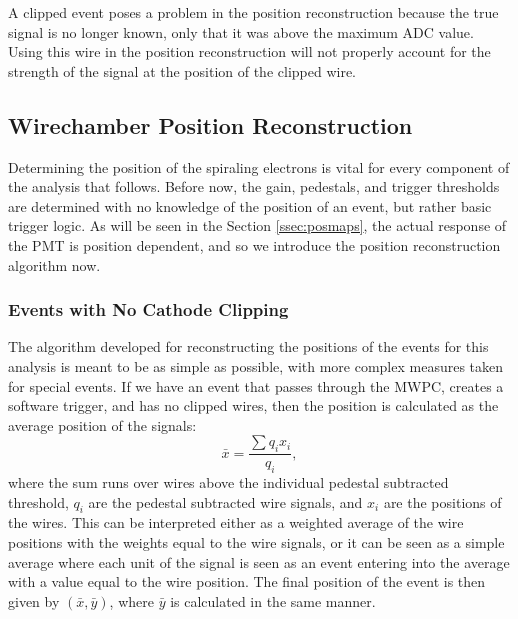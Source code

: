 A clipped event poses a problem in the position reconstruction because the true signal
is no longer known, only that it was above the maximum ADC value. Using this wire in
the position reconstruction will not properly account for the strength of the
signal at the position of the clipped wire.

\subsection{Wirechamber Position Reconstruction}

Determining the position of the spiraling electrons is vital for every component of the analysis
that follows. Before now, the gain, pedestals, and trigger thresholds are determined with no
knowledge of the position of an event, but rather basic trigger logic. As will be seen in
the Section \ref{ssec:posmaps}, the actual response of the PMT is position dependent, and so we introduce the
position reconstruction algorithm now.

\subsubsection{Events with No Cathode Clipping}

The algorithm developed for reconstructing the positions of the events for this analysis
is meant to be as simple as possible, with more complex measures taken for special events.
If we have an event that passes through the MWPC, creates a software trigger, and has no
clipped wires, then the position is calculated as the average position of the signals:
%
\begin{equation}
  \bar{x} = \frac{\sum q_i x_i}{q_i},
\end{equation}
%
where the sum runs over wires above the individual pedestal subtracted threshold, $q_i$ are the
pedestal subtracted wire signals, and $x_i$ are the positions of the wires.  This can
be interpreted either as a weighted average of the wire positions with the weights equal to
the wire signals, or it can be seen as a simple average where each unit of the signal is seen
as an event entering into the average with a value equal to the wire position. The final position
of the event is then given by $(\bar{x}, \bar{y})$, where $\bar{y}$ is calculated in the same manner.

